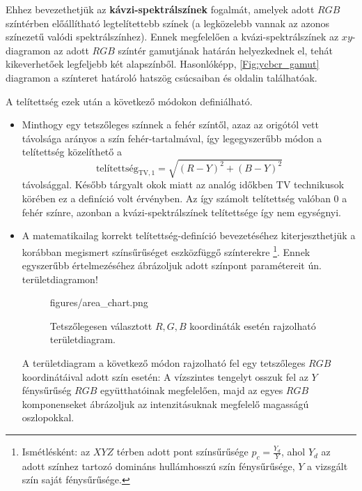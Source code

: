 Ehhez bevezethetjük az \textbf{kávzi-spektrálszínek} fogalmát, amelyek adott $RGB$ színtérben előállítható legtelítettebb színek (a legközelebb vannak az azonos színezetű valódi spektrálszínhez).
Ennek megfelelően a kvázi-spektrálszínek az $xy$-diagramon az adott $RGB$ színtér gamutjának határán helyezkednek el, tehát kikeverhetőek legfeljebb két alapszínből.
Hasonlóképp, \ref{Fig:ycbcr_gamut} diagramon a színteret határoló hatszög csúcsaiban és oldalin találhatóak.

A telítettség ezek után a következő módokon definiálható.
\begin{itemize}
\item  Minthogy egy tetszőleges színnek a fehér színtől, azaz az origótól vett távolsága arányos a szín fehér-tartalmával, így legegyszerűbb módon a telítettség közelíthető a
\begin{equation}
\text{telítettség}_{\mathrm{TV},1} = \sqrt{ (R-Y)^2 +(B-Y)^2}
\label{eq:saturation_1}
\end{equation}
távolsággal.
Később tárgyalt okok miatt az analóg időkben TV technikusok körében ez a definíció volt érvényben.
Az így számolt telítettség valóban $0$ a fehér színre, azonban a kvázi-spektrálszínek telítettsége így nem egységnyi.
%
\item A matematikailag korrekt telítettség-definíció bevezetéséhez kiterjeszthetjük a korábban megismert színsűrűséget eszközfüggő színterekre \footnote{Ismétlésként: az $XYZ$ térben adott pont színsűrűsége $p_c = \frac{Y_d}{Y}$, ahol $Y_d$ az adott színhez tartozó domináns hullámhosszú szín fénysűrűsége, $Y$ a vizsgált szín saját fénysűrűsége.}.
Ennek egyszerűbb értelmezéséhez ábrázoljuk adott színpont paramétereit ún. területdiagramon!
%
\begin{figure}[]
	\centering
	\begin{minipage}[c]{0.6\textwidth}
	\begin{overpic}[width = 1\columnwidth ]{figures/area_chart.png}
	\end{overpic} \end{minipage}\hfill
	\begin{minipage}[c]{0.4\textwidth}
	\caption{Tetszőlegesen választott $R,G,B$ koordináták esetén rajzolható területdiagram.}
	\label{Fig:area_diagram}  \end{minipage}
\end{figure}
%
A területdiagram a következő módon rajzolható fel egy tetszőleges $RGB$ koordinátáival adott szín esetén: 
A vízszintes tengelyt osszuk fel az $Y$ fénysűrűség $RGB$ együtthatóinak megfelelően, majd az egyes $RGB$ komponenseket ábrázoljuk az intenzitásuknak megfelelő magasságú oszlopokkal.

\end{itemize}
